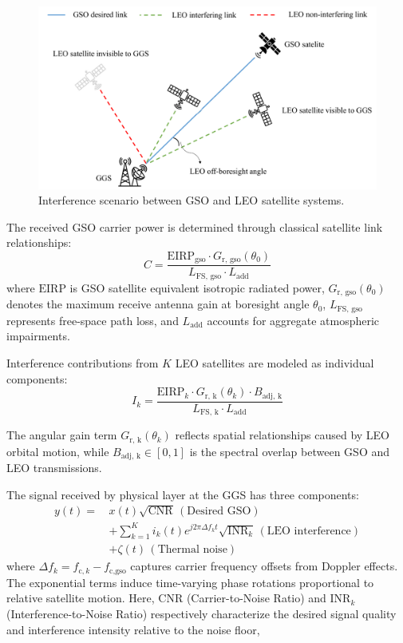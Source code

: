 \documentclass[conference]{IEEEtran}
\begin{document}
\begin{figure}[tb]
    \centering
    \includegraphics[width=\linewidth]{system-model.pdf}
    \caption{Interference scenario between GSO and LEO satellite systems.}
    \label{fig:interference-scenario}
\end{figure}

The received GSO carrier power is determined through classical satellite link relationships:
\begin{equation}
    C = \frac{\text{EIRP}_{\text{gso}} \cdot G_{\text{r, gso}}(\theta_0)}{L_{\text{FS, gso}} \cdot L_{\text{add}}}
    \label{eq:carrier_power}
\end{equation}
where $\text{EIRP}$ is GSO satellite equivalent isotropic radiated power, $G_{\text{r, gso}}(\theta_0)$ denotes the maximum receive antenna gain at boresight angle $\theta_0$, $L_{\text{FS, gso}}$ represents free-space path loss, and $L_{\text{add}}$ accounts for aggregate atmospheric impairments.

Interference contributions from $K$ LEO satellites are modeled as individual components:
\begin{equation}
    I_k = \frac{\text{EIRP}_k \cdot G_{\text{r, k}}(\theta_k) \cdot B_{\text{adj, k}}}{L_{\text{FS, k}} \cdot L_{\text{add}}}
    \label{eq:interference_power}
\end{equation}

The angular gain term $G_{\text{r, k}}(\theta_k)$ reflects spatial relationships caused by LEO orbital motion, while $B_{\text{adj, k}} \in [0,1]$ is the spectral overlap between GSO and LEO transmissions.

The signal received by physical layer at the GGS has three components:
\begin{align}
    y(t) =\, & x(t)\sqrt{\text{CNR}}\, (\text{Desired GSO}) \nonumber                                                 \\[0.5em]
             & + \sum_{k=1}^{K} i_k(t)e^{j2\pi \Delta f_k t}\sqrt{\text{INR}_k}\, (\text{LEO interference}) \nonumber \\[0.5em]
             & + \zeta(t)\, (\text{Thermal noise})
\end{align}
where $\Delta f_k = f_{\text{c},k} - f_{\text{c,gso}}$ captures carrier frequency offsets from Doppler effects. The exponential terms induce time-varying phase rotations proportional to relative satellite motion. Here, $\text{CNR}$ (Carrier-to-Noise Ratio) and $\text{INR}_k$ (Interference-to-Noise Ratio) respectively characterize the desired signal quality and interference intensity relative to the noise floor,
\end{document}
